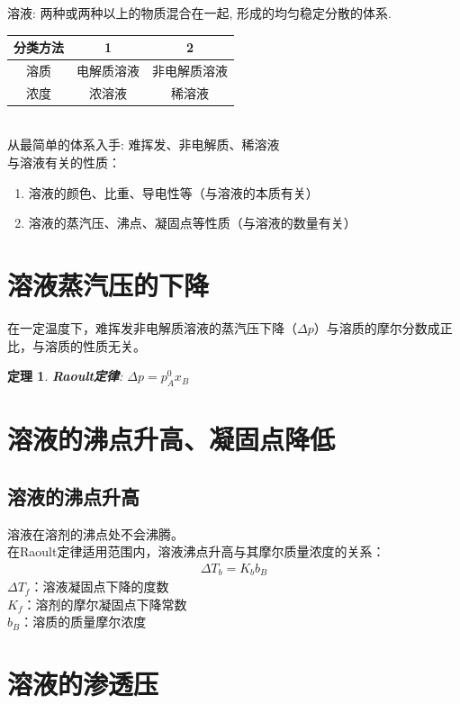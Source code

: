 \documentclass[12pt, a4paper, oneside]{ctexbook}
\newtheorem{theorem}{定理}[section]
\begin{document}
溶液: 两种或两种以上的物质混合在一起, 形成的均匀稳定分散的体系. 
\begin{table}[htbp]
    \centering
    \begin{tabular}{|c|c|c|}
        \hline
        分类方法 & 1 & 2\\
        \hline
        溶质 & 电解质溶液 & 非电解质溶液\\
        \hline
        浓度 & 浓溶液 & 稀溶液\\
        \hline
    \end{tabular}
\end{table}
\\从最简单的体系入手: 难挥发、非电解质、稀溶液
\\与溶液有关的性质：
\begin{enumerate}
    \item 溶液的颜色、比重、导电性等（与溶液的本质有关）
    \item 溶液的蒸汽压、沸点、凝固点等性质（与溶液的数量有关）
\end{enumerate}

\section{溶液蒸汽压的下降}
在一定温度下，难挥发非电解质溶液的蒸汽压下降（$\Delta p$）与溶质的摩尔分数成正比，与溶质的性质无关。
\begin{theorem}
    \textbf{Raoult定律}: $\Delta p = p_A^0 x_B$
\end{theorem}

\section{溶液的沸点升高、凝固点降低}
\subsection{溶液的沸点升高}
溶液在溶剂的沸点处不会沸腾。\\
在Raoult定律适用范围内，溶液沸点升高与其摩尔质量浓度的关系：
\begin{align*}
    \Delta T_b = K_b b_B
\end{align*}
$\Delta T_f$：溶液凝固点下降的度数\\
$K_f$：溶剂的摩尔凝固点下降常数\\
$b_B$：溶质的质量摩尔浓度\\

\section{溶液的渗透压}
\end{document}
